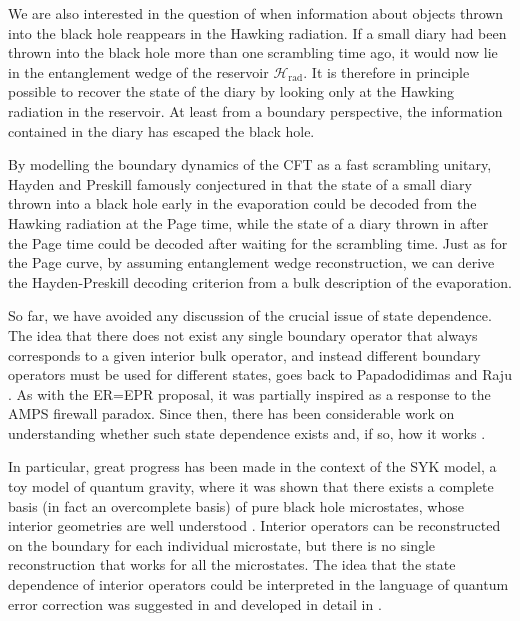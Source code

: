 \documentclass[11pt,a4paper]{article}
\begin{document}
We are also interested in the question of when information about objects thrown into the black hole reappears in the Hawking radiation. If a small diary had been thrown into the black hole more than one scrambling time ago, it would now lie in the entanglement wedge of the reservoir $\mathcal{H}_\text{rad}$. It is therefore in principle possible to recover the state of the diary by looking only at the Hawking radiation in the reservoir. At least from a boundary perspective, the information contained in the diary has escaped the black hole.

By modelling the boundary dynamics of the CFT as a fast scrambling unitary, Hayden and Preskill famously conjectured in \cite{hayden2007black} that the state of a small diary thrown into a black hole early in the evaporation could be decoded from the Hawking radiation at the Page time, while the state of a diary thrown in after the Page time could be decoded after waiting for the scrambling time. Just as for the Page curve, by assuming entanglement wedge reconstruction, we can derive the Hayden-Preskill decoding criterion from a bulk description of the evaporation.

So far, we have avoided any discussion of the crucial issue of state dependence. The idea that there does not exist any single boundary operator that always corresponds to a given interior bulk operator, and instead different boundary operators must be used for different states, goes back to Papadodidimas and Raju \cite{papadodimas2013infalling, papadodimas2014state}.  As with the ER=EPR proposal, it was partially inspired as a response to the AMPS firewall paradox. Since then, there has been considerable work on understanding whether such state dependence exists and, if so, how it works \cite{harlow2014aspects, papadodimas2016remarks, de2018interior}.

In particular, great progress has been made in the context of the SYK model, a toy model of quantum gravity, where it was shown that there exists a complete basis (in fact an overcomplete basis) of pure black hole microstates, whose interior geometries are well understood \cite{kourkoulou2017pure}. Interior operators can be reconstructed on the boundary for each individual microstate, but there is no single reconstruction that works for all the microstates. The idea that the state dependence of interior operators could be interpreted in the language of quantum error correction was suggested in \cite{hayden2018learning} and developed in detail in \cite{almheiri2018holographic}.
\end{document}
